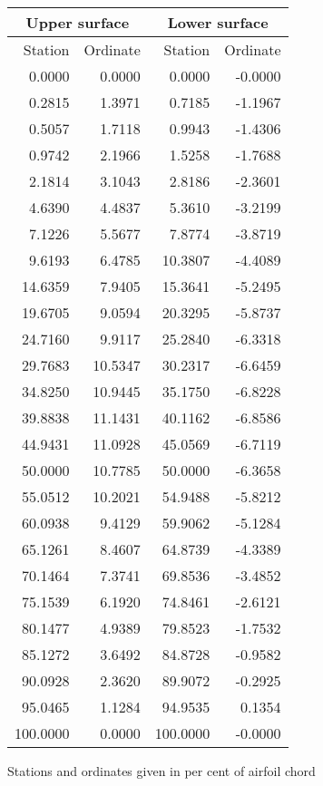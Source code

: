 \documentclass[11pt]{book}
\begin{document}
 \hspace{4mm}
 \begin{tabular}{|r|r|r|r|} \hline 
 \multicolumn{2}{|c|}{Upper surface} & \multicolumn{2}{|c|}{Lower surface} \\
 \hline
 Station & Ordinate & Station & Ordinate \\
 \hline
0.0000 & 0.0000 & 0.0000 & -0.0000 \\
0.2815 & 1.3971 & 0.7185 & -1.1967 \\
0.5057 & 1.7118 & 0.9943 & -1.4306 \\
0.9742 & 2.1966 & 1.5258 & -1.7688 \\
2.1814 & 3.1043 & 2.8186 & -2.3601 \\
4.6390 & 4.4837 & 5.3610 & -3.2199 \\
7.1226 & 5.5677 & 7.8774 & -3.8719 \\
9.6193 & 6.4785 & 10.3807 & -4.4089 \\
14.6359 & 7.9405 & 15.3641 & -5.2495 \\
19.6705 & 9.0594 & 20.3295 & -5.8737 \\
24.7160 & 9.9117 & 25.2840 & -6.3318 \\
29.7683 & 10.5347 & 30.2317 & -6.6459 \\
34.8250 & 10.9445 & 35.1750 & -6.8228 \\
39.8838 & 11.1431 & 40.1162 & -6.8586 \\
44.9431 & 11.0928 & 45.0569 & -6.7119 \\
50.0000 & 10.7785 & 50.0000 & -6.3658 \\
55.0512 & 10.2021 & 54.9488 & -5.8212 \\
60.0938 & 9.4129 & 59.9062 & -5.1284 \\
65.1261 & 8.4607 & 64.8739 & -4.3389 \\
70.1464 & 7.3741 & 69.8536 & -3.4852 \\
75.1539 & 6.1920 & 74.8461 & -2.6121 \\
80.1477 & 4.9389 & 79.8523 & -1.7532 \\
85.1272 & 3.6492 & 84.8728 & -0.9582 \\
90.0928 & 2.3620 & 89.9072 & -0.2925 \\
95.0465 & 1.1284 & 94.9535 & 0.1354 \\
100.0000 & 0.0000 & 100.0000 & -0.0000 \\
 \hline 
 \end{tabular}
 \vspace{8mm}

Stations and ordinates given in per cent of airfoil chord
\end{document}
